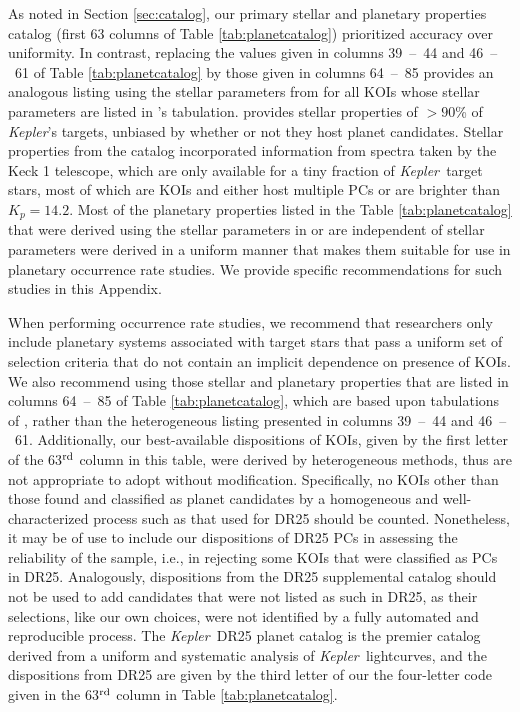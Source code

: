 \documentclass{aastex62}
\newcommand{\ikt}{{\it Kepler}}
\newcommand{\ik}{{\it Kepler~}}
\begin{document}
As noted in Section \ref{sec:catalog}, our primary stellar and planetary properties catalog (first 63 columns of Table \ref{tab:planetcatalog}) prioritized accuracy over uniformity. In contrast, replacing the values given in columns 39~--~44 and 46~--~61 of Table \ref{tab:planetcatalog} by those given in columns 64~--~85 provides an analogous listing using the stellar parameters from \cite{Berger:2020a} for all KOIs whose stellar parameters are listed in \cite{Berger:2020a}'s tabulation. \cite{Berger:2020a} provides stellar properties of $> 90$\% of \ikt's targets, unbiased by whether or not they host planet candidates. Stellar properties from the \cite{Fulton:2018} catalog incorporated information from spectra taken by the Keck 1 telescope, which are only available for a tiny fraction of \ik target stars, most of which are KOIs and either host multiple PCs or are brighter than $K_p=14.2$. Most of the planetary properties listed in the Table \ref{tab:planetcatalog} that were derived using the stellar parameters in \cite{Berger:2020a} or are independent of stellar parameters were derived in a uniform manner that makes them suitable for use in planetary occurrence rate studies.  We provide specific recommendations for such studies in this Appendix.

When performing occurrence rate studies, we recommend that
researchers only include planetary systems associated with target stars that pass a uniform set of selection criteria that do not contain an
implicit dependence on presence of KOIs. We also recommend using those stellar and planetary properties that are listed in columns 64~--~85 of Table \ref{tab:planetcatalog}, which are based upon tabulations of \cite{Berger:2020a}, rather than the heterogeneous listing presented in columns  39~--~44 and 46~--~61. Additionally, our best-available dispositions of KOIs, given by the first letter of the 63$^{\rm rd}$ column in this table, were derived by heterogeneous methods, thus are not appropriate {to adopt without modification. Specifically, no KOIs other than those found and classified as planet candidates by a homogeneous and well-characterized process such as that used for DR25 should be counted. Nonetheless, it may be of use to include our dispositions of DR25 PCs in assessing the reliability of the sample, i.e., in rejecting some KOIs that were classified as PCs in DR25}. Analogously,
dispositions from the DR25 supplemental catalog should not be
used to add candidates that were not listed as such in DR25, as their selections, like our own choices, were not identified by a fully automated and reproducible process. 
The \ik DR25 planet catalog  \citep{Thompson:2018} is the premier catalog derived from a uniform and
systematic analysis of \ik lightcurves, and the dispositions from DR25 are given by the third letter of our the four-letter code given in the 63$^{\rm rd}$ column in Table \ref{tab:planetcatalog}.  
\end{document}
